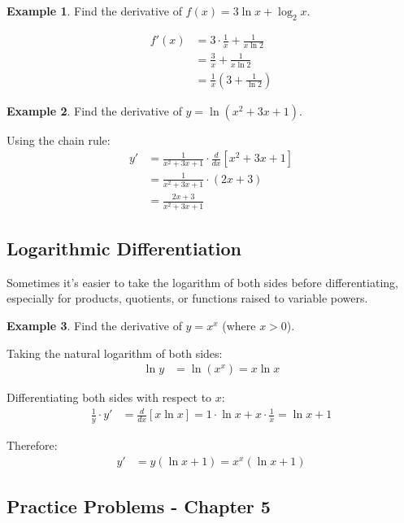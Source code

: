 \documentclass[12pt,a4paper]{book}
\theoremstyle{definition}
\newtheorem{example}{Example}[chapter]
\begin{document}
\begin{example}
Find the derivative of $f(x) = 3\ln x + \log_2 x$.

\begin{align}
f'(x) &= 3 \cdot \frac{1}{x} + \frac{1}{x \ln 2}\\
&= \frac{3}{x} + \frac{1}{x \ln 2}\\
&= \frac{1}{x}\left(3 + \frac{1}{\ln 2}\right)
\end{align}
\end{example}

\begin{example}
Find the derivative of $y = \ln(x^2 + 3x + 1)$.

Using the chain rule:
\begin{align}
y' &= \frac{1}{x^2 + 3x + 1} \cdot \frac{d}{dx}[x^2 + 3x + 1]\\
&= \frac{1}{x^2 + 3x + 1} \cdot (2x + 3)\\
&= \frac{2x + 3}{x^2 + 3x + 1}
\end{align}
\end{example}

\subsection{Logarithmic Differentiation}

Sometimes it's easier to take the logarithm of both sides before differentiating, especially for products, quotients, or functions raised to variable powers.

\begin{example}
Find the derivative of $y = x^x$ (where $x > 0$).

Taking the natural logarithm of both sides:
\begin{align}
\ln y &= \ln(x^x) = x \ln x
\end{align}

Differentiating both sides with respect to $x$:
\begin{align}
\frac{1}{y} \cdot y' &= \frac{d}{dx}[x \ln x] = 1 \cdot \ln x + x \cdot \frac{1}{x} = \ln x + 1
\end{align}

Therefore:
\begin{align}
y' &= y(\ln x + 1) = x^x(\ln x + 1)
\end{align}
\end{example}

\subsection{Practice Problems - Chapter 5}
\end{document}
